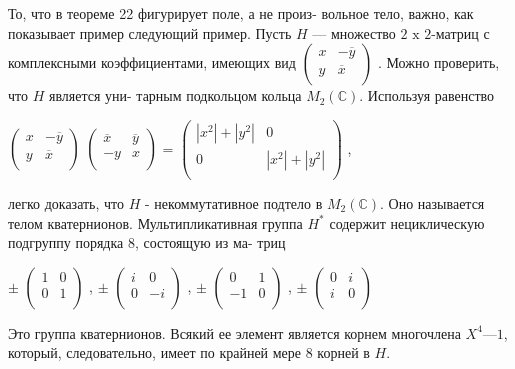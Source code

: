 \begin{mynotice}
То, что в теореме 22 фигурирует поле, а не произ-\linebreak
вольное тело, важно, как показывает пример следующий пример. Пусть\linebreak
$H$ --- множество $2\text{ x }2$-матриц с комплексными коэффициентами,\linebreak
\pagebreak
\linebreak 
\noindent имеющих вид $\begin{pmatrix}
	x & -\overline{y}\\
	y & \overline{x}\\
\end{pmatrix}$
. Можно проверить, что $H$ является уни-\linebreak
тарным подкольцом кольца $M_2(\mathbb{C})$. Используя равенство\\
\begin{center}
$\begin{pmatrix}
	x & -\overline{y}\\
	y & \overline{x}\\
\end{pmatrix}$
$\begin{pmatrix}
	\overline{x} & \overline{y}\\
	-y & x\\
\end{pmatrix}$
=
$\begin{pmatrix}
	|x^2| + |y^2| & 0\\
	0 & |x^2| + |y^2|\\
\end{pmatrix}$
,
\end{center}
легко доказать, что $H$ - некоммутативное подтело в $M_2(\mathbb{C})$. Оно \linebreak
называется телом кватернионов. Мультипликативная группа $H^*$\linebreak
содержит нециклическую подгруппу порядка 8, состоящую из ма­-\linebreak
триц
\begin{center}
$\pm$
$\begin{pmatrix}
	1 & 0\\
	0 & 1\\
\end{pmatrix}$
,
$\pm$
$\begin{pmatrix}
	i & 0\\
	0 & -i\\
\end{pmatrix}$
,
$\pm$
$\begin{pmatrix}
	0 & 1\\
	-1 & 0\\
\end{pmatrix}$
,
$\pm$
$\begin{pmatrix}
	0 & i\\
	i & 0\\
\end{pmatrix}$
\end{center}
Это группа кватернионов. Всякий ее элемент является корнем
многочлена $X^4 — 1$, который, следовательно, имеет по крайней
мере $8$ корней в $H$.
\end{mynotice}

